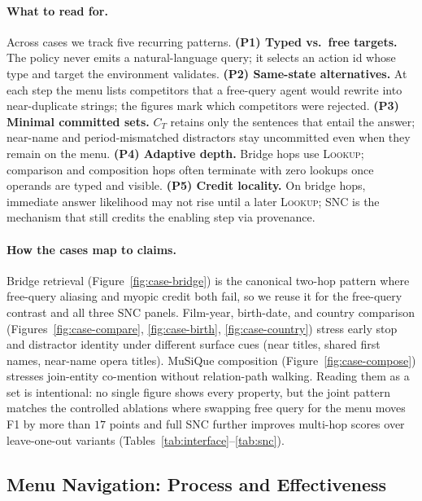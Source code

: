 \documentclass[letterpaper]{article} %
\begin{document}
\paragraph{What to read for.}
Across cases we track five recurring patterns.
\textbf{(P1) Typed vs.\ free targets.} The policy never emits a natural-language query; it selects an action id whose type and target the environment validates.
\textbf{(P2) Same-state alternatives.} At each step the menu lists competitors that a free-query agent would rewrite into near-duplicate strings; the figures mark which competitors were rejected.
\textbf{(P3) Minimal committed sets.} $C_T$ retains only the sentences that entail the answer; near-name and period-mismatched distractors stay uncommitted even when they remain on the menu.
\textbf{(P4) Adaptive depth.} Bridge hops use \textsc{Lookup}; comparison and composition hops often terminate with zero lookups once operands are typed and visible.
\textbf{(P5) Credit locality.} On bridge hops, immediate answer likelihood may not rise until a later \textsc{Lookup}; SNC is the mechanism that still credits the enabling step via provenance.

\paragraph{How the cases map to claims.}
Bridge retrieval (Figure~\ref{fig:case-bridge}) is the canonical two-hop pattern where free-query aliasing and myopic credit both fail, so we reuse it for the free-query contrast and all three SNC panels.
Film-year, birth-date, and country comparison (Figures~\ref{fig:case-compare}, \ref{fig:case-birth}, \ref{fig:case-country}) stress early stop and distractor identity under different surface cues (near titles, shared first names, near-name opera titles).
MuSiQue composition (Figure~\ref{fig:case-compose}) stresses join-entity co-mention without relation-path walking.
Reading them as a set is intentional: no single figure shows every property, but the joint pattern matches the controlled ablations where swapping free query for the menu moves F1 by more than $17$ points and full SNC further improves multi-hop scores over leave-one-out variants (Tables~\ref{tab:interface}--\ref{tab:snc}).

\subsection{Menu Navigation: Process and Effectiveness}
\end{document}
